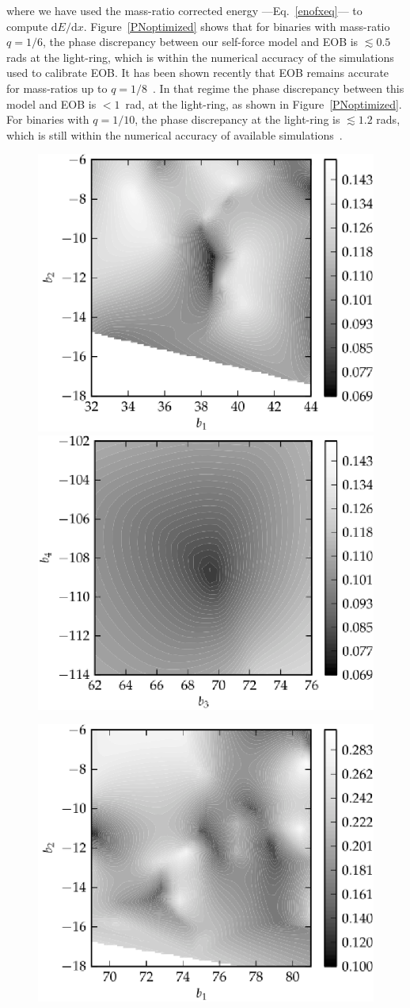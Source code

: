 \noindent where we have used the mass-ratio corrected energy ---Eq.~\eqref{enofxeq}--- to compute \({\mathrm{d}}E/{\mathrm{d}}x\). Figure~\ref{PNoptimized} shows that for binaries with mass-ratio \(q=1/6\), the phase discrepancy between our self-force model and EOB is \(\lesssim 0.5\) rads at the light-ring, which is within the numerical accuracy of the simulations used to calibrate EOB. It has been shown recently that EOB remains accurate for mass-ratios up to \(q=1/8\)~\cite{Pan:2013}. In that regime the phase discrepancy between this model and EOB is $< 1$~rad, at the light-ring, as shown in Figure~\ref{PNoptimized}. For binaries with \(q=1/10\), the phase discrepancy at the light-ring is \(\lesssim 1.2\) rads, which is still within the numerical accuracy of available simulations~\cite{carlosI, carlosII}. 

\begin{figure}%
\centerline{
\includegraphics[height=0.5\textwidth,  clip]{figures/imrimri/b1b2_mapb1b2m1m6no.eps}
\includegraphics[height=0.5\textwidth,  clip]{figures/imrimri/b3b4_mapb3b4m1m6no.eps}
}
\centerline{
\includegraphics[height=0.5\textwidth,  clip]{figures/imrimri/b1b2_mapb1b2m1m8no.eps}
}
\end{figure}
